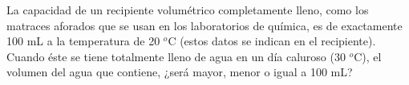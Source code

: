  
La capacidad de un recipiente volumétrico completamente lleno, como los matraces aforados que se usan en los laboratorios de química, es de exactamente 100 mL a la temperatura de 20 $^o$C (estos datos se indican en el recipiente). Cuando éste se tiene totalmente lleno de agua en un día caluroso (30 $^o$C), el volumen del agua que contiene, ¿será mayor, menor o igual a 100 mL?